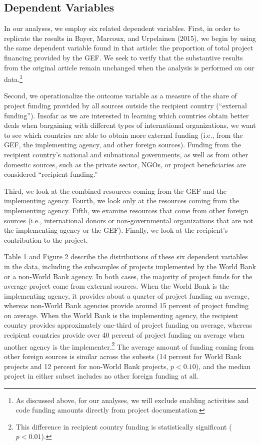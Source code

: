 \documentclass{article}
\begin{document}
\subsection{Dependent Variables}
In our analyses, we employ six related dependent variables.  First, in order to replicate the results in Bayer, Marcoux, and Urpelainen (2015), we begin by using the same dependent variable found in that article: the proportion of total project financing provided by the GEF.  We seek to verify that the substantive results from the original article remain unchanged when the analysis is performed on our data.\footnote{As discussed above, for our analyses, we will exclude enabling activities and code funding amounts directly from project documentation.}
   
Second, we operationalize the outcome variable as a measure of the share of project funding provided by all sources outside the recipient country (“external funding”).  Insofar as we are interested in learning which countries obtain better deals when bargaining with different types of international organizations, we want to see which countries are able to obtain more external funding (i.e., from the GEF, the implementing agency, and other foreign sources).  Funding from the recipient country’s national and subnational governments, as well as from other domestic sources, such as the private sector, NGOs, or project beneficiaries are considered “recipient funding.”  

Third, we look at the combined resources coming from the GEF and the implementing agency.  Fourth, we look only at the resources coming from the implementing agency.  Fifth, we examine resources that come from other foreign sources (i.e., international donors or non-governmental organizations that are not the implementing agency or the GEF).  Finally, we look at the recipient’s contribution to the project.

Table 1 and Figure 2 describe the distributions of these six dependent variables in the data, including the subsamples of projects implemented by the World Bank or a non-World Bank agency.  In both cases, the majority of project funds for the average project come from external sources.  When the World Bank is the implementing agency, it provides about a quarter of project funding on average, whereas non-World Bank agencies provide around 15 percent of project funding on average.  When the World Bank is the implementing agency, the recipient country provides approximately one-third of project funding on average, whereas recipient countries provide over 40 percent of project funding on average when another agency is the implementer.\footnote{This difference in recipient country funding is statistically significant ($p < 0.01$).}   The average amount of funding coming from other foreign sources is similar across the subsets (14 percent for World Bank projects and 12 percent for non-World Bank projects, $p < 0.10$), and the median project in either subset includes no other foreign funding at all. 
\end{document}
